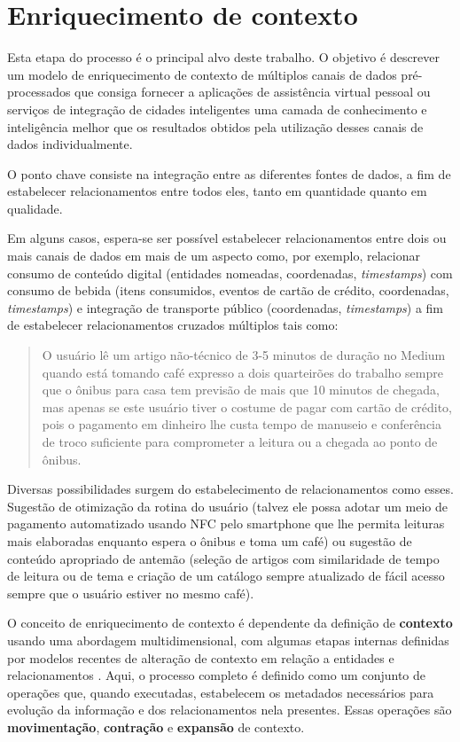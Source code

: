 \chapter{Enriquecimento de contexto}

Esta etapa do processo é o principal alvo deste trabalho. O objetivo é descrever um modelo de enriquecimento de contexto de múltiplos canais de dados pré-processados que consiga fornecer a aplicações de assistência virtual pessoal ou serviços de integração de cidades inteligentes uma camada de conhecimento e inteligência melhor que os resultados obtidos pela utilização desses canais de dados individualmente.

O ponto chave consiste na integração entre as diferentes fontes de dados, a fim de estabelecer relacionamentos entre todos eles, tanto em quantidade quanto em qualidade.

Em alguns casos, espera-se ser possível estabelecer relacionamentos entre dois ou mais canais de dados em mais de um aspecto como, por exemplo, relacionar consumo de conteúdo digital (entidades nomeadas, coordenadas, \textit{timestamps}) com consumo de bebida (itens consumidos, eventos de cartão de crédito, coordenadas, \textit{timestamps}) e integração de transporte público (coordenadas, \textit{timestamps}) a fim de estabelecer relacionamentos cruzados múltiplos tais como:
\begin{quote}
    O usuário lê um artigo não-técnico de 3-5 minutos de duração no Medium quando está tomando café expresso a dois quarteirões do trabalho sempre que o ônibus para casa tem previsão de mais que 10 minutos de chegada, mas apenas se este usuário tiver o costume de pagar com cartão de crédito, pois o pagamento em dinheiro lhe custa tempo de manuseio e conferência de troco suficiente para comprometer a leitura ou a chegada ao ponto de ônibus.
\end{quote}

Diversas possibilidades surgem do estabelecimento de relacionamentos como esses. Sugestão de otimização da rotina do usuário (talvez ele possa adotar um meio de pagamento automatizado usando NFC pelo smartphone que lhe permita leituras mais elaboradas enquanto espera o ônibus e toma um café) ou sugestão de conteúdo apropriado de antemão (seleção de artigos com similaridade de tempo de leitura ou de tema e criação de um catálogo sempre atualizado de fácil acesso sempre que o usuário estiver no mesmo café).

O conceito de enriquecimento de contexto é dependente da definição de \textbf{contexto} usando uma abordagem multidimensional, com algumas etapas internas definidas por modelos recentes de alteração de contexto em relação a entidades e relacionamentos \cite{contextenrichment:multi}. Aqui, o processo completo é definido como um conjunto de operações que, quando executadas, estabelecem os metadados necessários para evolução da informação e dos relacionamentos nela presentes. Essas operações são \textbf{movimentação}, \textbf{contração} e \textbf{expansão} de contexto.


